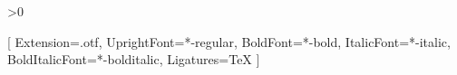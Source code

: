 
\usepackage{ifthen} %

\usepackage[magyar]{babel} %
\usepackage[margin=2.5cm]{geometry} %
\usepackage{amsfonts,amsmath,amssymb,siunitx} %
\usepackage{mhchem}
\usepackage{lmodern} %
\usepackage{microtype} %
\usepackage{setspace} %
\usepackage{cmap} %
\usepackage{caption}
\usepackage{subcaption} %

\usepackage[unicode]{hyperref} %
\usepackage{booktabs} %
\usepackage{ltablex} %
\usepackage{graphicx} %
\usepackage{xcolor} %
\usepackage{listings} %
\usepackage[amsmath,thmmarks]{ntheorem} %

\usepackage{tikz} %
\usepackage{pgfplots} %


\usepackage{ifxetex}
\usepackage{ifluatex}
\newif\ifxetexorluatex %
\fi{}\fi>0
\xetexorluatextrue
\fi

\ifxetexorluatex
\usepackage{fontspec}
\setmainfont{texgyrepagella}[
  Extension=.otf,
  UprightFont=*-regular, 
  BoldFont=*-bold, 
  ItalicFont=*-italic, 
  BoldItalicFont=*-bolditalic,
  Ligatures=TeX
  ]
\usepackage{newpxmath}
\else
\usepackage[T1]{fontenc}
\usepackage[utf8]{inputenc}
\usepackage{tgpagella, newpxmath}
\fi

\usepackage{csquotes} %
\usepackage[
  autocite=superscript,   %
  backend=biber,     %
  style=numeric,        %
  sorting=nyt,        %
]{biblatex} %
